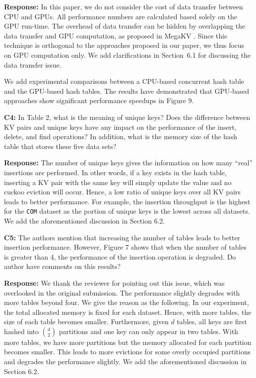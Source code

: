 \noindent\textbf{Response:} 
In this paper, we do not consider the cost of data transfer between CPU and GPUs. All performance numbers are calculated based solely on the GPU run-time. 
The overhead of data transfer can be hidden by overlapping the data transfer and GPU computation, as proposed in MegaKV \cite{zhang2015mega}. Since this technique is orthogonal to the approaches proposed in our paper, we thus focus on GPU computation only. We add clarifications in Section~6.1 for discussing the data transfer issue.

We add experimental comparisons between a CPU-based concurrent hash table \cite{li2014algorithmic} and the GPU-based hash tables. The results have demonstrated that GPU-based approaches show significant performance speedups in Figure 9.  

\begin{shaded}
	\noindent\textbf{C4:} In Table 2, what is the meaning of unique keys? Does the difference between KV pairs and unique keys have any impact on the performance of the insert, delete, and find operations? In addition, what is the memory size of the hash table that stores these five data sets?
\end{shaded}

\noindent\textbf{Response:} 
The number of unique keys gives the information on how many ``real'' insertions are performed. In other words, if a key exists in the hash table, inserting a KV pair with the same key will simply update the value and no cuckoo eviction will occur. Hence, a low ratio of unique keys over all KV pairs leads to better performance. For example, the insertion throughput is the highest for the {\tt COM} dataset as the portion of unique keys is the lowest across all datasets. We add the aforementioned discussion in Section 6.2.

\begin{shaded}
	\noindent\textbf{C5:} The authors mention that increasing the number of tables leads to better insertion performance. However, Figure 7 shows that when the number of tables is greater than 4, the performance of the insertion operation is degraded. Do author have comments on this results?
\end{shaded}

\noindent\textbf{Response:} We thank the reviewer for pointing out this issue, which was overlooked in the original submission. The performance slightly degrades with more tables beyond four. We give the reason as the following. In our experiment, the total allocated memory is fixed for each dataset. 
Hence, with more tables, the size of each table becomes smaller. Furthermore, given $d$ tables, all keys are first hashed into $\binom{d}{2}$ partitions and one key can only appear in two tables. 
With more tables, we have more partitions but the memory allocated for each partition becomes smaller. This leads to more evictions for some overly occupied partitions and degrades the performance slightly. We add the aforementioned discussion in Section 6.2.